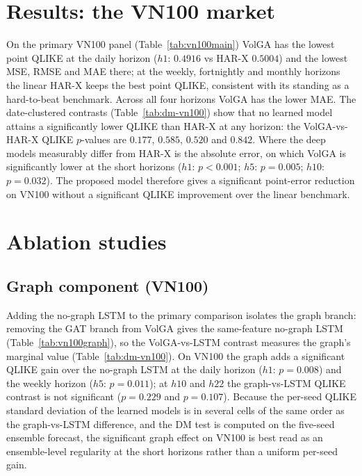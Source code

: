 \documentclass[runningheads]{llncs}
\begin{document}
\section{Results: the VN100 market}\label{sec:results}
On the primary VN100 panel (Table~\ref{tab:vn100main}) VolGA has the lowest point QLIKE at the daily
horizon ($h1$: $0.4916$ vs HAR-X $0.5004$) and the lowest MSE, RMSE and MAE there; at the weekly,
fortnightly and monthly horizons the linear HAR-X keeps the best point QLIKE, consistent with its
standing as a hard-to-beat benchmark. Across all four horizons VolGA has the lower MAE. The
date-clustered contrasts (Table~\ref{tab:dm-vn100}) show that no learned model attains a significantly
lower QLIKE than HAR-X at any horizon: the VolGA-vs-HAR-X QLIKE $p$-values are $0.177$, $0.585$,
$0.520$ and $0.842$. Where the deep models measurably differ from HAR-X is the absolute error, on
which VolGA is significantly lower at the short horizons ($h1$: $p<0.001$; $h5$: $p=0.005$; $h10$:
$p=0.032$). The proposed model therefore gives a significant point-error reduction on VN100 without a
significant QLIKE improvement over the linear benchmark.

\FloatBarrier
\section{Ablation studies}\label{sec:abl}
\subsection{Graph component (VN100)}\label{sec:graph}
Adding the no-graph LSTM to the primary comparison isolates the graph branch: removing the GAT branch
from VolGA gives the same-feature no-graph LSTM (Table~\ref{tab:vn100graph}), so the VolGA-vs-LSTM
contrast measures the graph's marginal value (Table~\ref{tab:dm-vn100}). On VN100 the graph adds a
significant QLIKE gain over the no-graph LSTM at the daily horizon ($h1$: $p=0.008$) and the weekly
horizon ($h5$: $p=0.011$); at $h10$ and $h22$ the graph-vs-LSTM QLIKE contrast is not significant
($p=0.229$ and $p=0.107$). Because the per-seed QLIKE standard deviation of the learned models is in
several cells of the same order as the graph-vs-LSTM difference, and the DM test is computed on the
five-seed ensemble forecast, the significant graph effect on VN100 is best read as an ensemble-level
regularity at the short horizons rather than a uniform per-seed gain.
\end{document}
